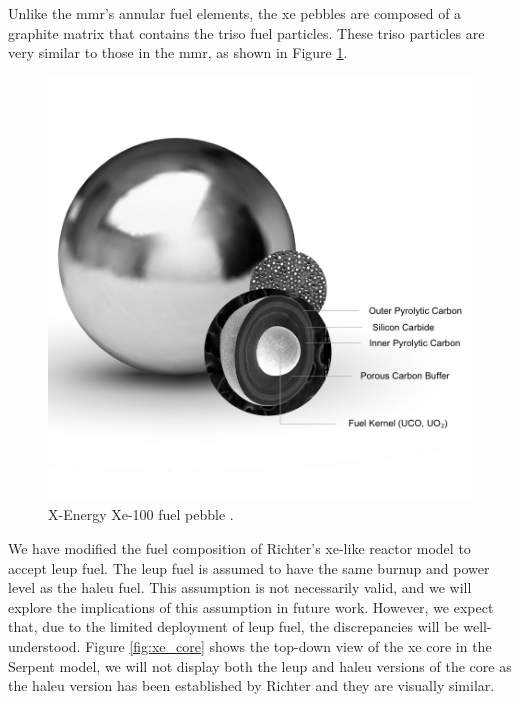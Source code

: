 Unlike the \gls{mmr}'s annular fuel elements, the \gls{xe} pebbles are composed of a graphite matrix that contains the \gls{triso} fuel particles. These \gls{triso} particles are very similar to those in the \gls{mmr}, as shown in Figure \ref{fig:xe_fuel}.

\begin{figure}[H]
    \centering
    \includegraphics[scale=0.28]{images/reactor_design/graphic-triso-x-pebble.jpg}
    \caption{X-Energy Xe-100 fuel pebble \cite{xe_fuel}.}
    \label{fig:xe_fuel}
\end{figure}


We have modified the fuel composition of Richter's \gls{xe}-like reactor model to accept \gls{leup} fuel. The \gls{leup} fuel is assumed to have the same burnup and power level as the \gls{haleu} fuel. This assumption is not necessarily valid, and we will explore the implications of this assumption in future work. However, we expect that, due to the limited deployment of \gls{leup} fuel, the discrepancies will be well-understood. Figure \ref{fig:xe_core} shows the top-down view of the \gls{xe} core in the Serpent model, we will not display both the \gls{leup} and \gls{haleu} versions of the core as the \gls{haleu} version has been established by Richter \cite{richter_thesis_2022} and they are visually similar.

